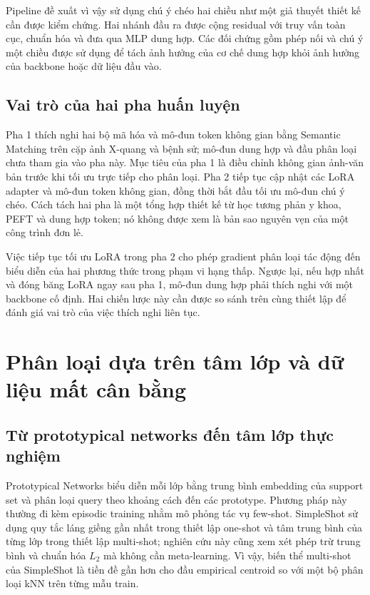 Pipeline đề xuất vì vậy sử dụng chú ý chéo hai chiều như một giả thuyết thiết kế cần được kiểm chứng. Hai nhánh đầu ra được cộng residual với truy vấn toàn cục, chuẩn hóa và đưa qua MLP dung hợp. Các đối chứng gồm phép nối và chú ý một chiều được sử dụng để tách ảnh hưởng của cơ chế dung hợp khỏi ảnh hưởng của backbone hoặc dữ liệu đầu vào.

\subsection{Vai trò của hai pha huấn luyện}

Pha 1 thích nghi hai bộ mã hóa và mô-đun token không gian bằng Semantic Matching trên cặp ảnh X-quang và bệnh sử; mô-đun dung hợp và đầu phân loại chưa tham gia vào pha này. Mục tiêu của pha 1 là điều chỉnh không gian ảnh-văn bản trước khi tối ưu trực tiếp cho phân loại. Pha 2 tiếp tục cập nhật các LoRA adapter và mô-đun token không gian, đồng thời bắt đầu tối ưu mô-đun chú ý chéo. Cách tách hai pha là một tổng hợp thiết kế từ học tương phản y khoa, PEFT và dung hợp token; nó không được xem là bản sao nguyên vẹn của một công trình đơn lẻ.

Việc tiếp tục tối ưu LoRA trong pha 2 cho phép gradient phân loại tác động đến biểu diễn của hai phương thức trong phạm vi hạng thấp. Ngược lại, nếu hợp nhất và đóng băng LoRA ngay sau pha 1, mô-đun dung hợp phải thích nghi với một backbone cố định. Hai chiến lược này cần được so sánh trên cùng thiết lập để đánh giá vai trò của việc thích nghi liên tục.

\section{Phân loại dựa trên tâm lớp và dữ liệu mất cân bằng}

\subsection{Từ prototypical networks đến tâm lớp thực nghiệm}

Prototypical Networks \cite{Snell2017ProtoNet} biểu diễn mỗi lớp bằng trung bình embedding của support set và phân loại query theo khoảng cách đến các prototype. Phương pháp này thường đi kèm episodic training nhằm mô phỏng tác vụ few-shot. SimpleShot \cite{Wang2019SimpleShot} sử dụng quy tắc láng giềng gần nhất trong thiết lập one-shot và tâm trung bình của từng lớp trong thiết lập multi-shot; nghiên cứu này cũng xem xét phép trừ trung bình và chuẩn hóa $L_2$ mà không cần meta-learning. Vì vậy, biến thể multi-shot của SimpleShot là tiền đề gần hơn cho đầu empirical centroid so với một bộ phân loại kNN trên từng mẫu train.

